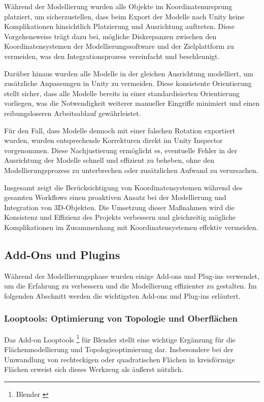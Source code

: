 Während der Modellierung wurden alle Objekte im Koordinatenursprung platziert, um sicherzustellen, dass beim Export
der Modelle nach Unity keine Komplikationen hinsichtlich Platzierung und Ausrichtung auftreten. Diese Vorgehensweise
trägt dazu bei, mögliche Diskrepanzen zwischen den Koordinatensystemen der Modellierungssoftware und der Zielplattform
zu vermeiden, was den Integrationsprozess vereinfacht und beschleunigt.

Darüber hinaus wurden alle Modelle in der gleichen Ausrichtung modelliert, um zusätzliche Anpassungen in Unity zu
vermeiden. Diese konsistente Orientierung stellt sicher, dass alle Modelle bereits in einer standardisierten
Orientierung vorliegen, was die Notwendigkeit weiterer manueller Eingriffe minimiert und einen reibungsloseren
Arbeitsablauf gewährleistet.

Für den Fall, dass Modelle dennoch mit einer falschen Rotation exportiert wurden, wurden entsprechende Korrekturen
direkt im Unity Inspector vorgenommen. Diese Nachjustierung ermöglicht es, eventuelle Fehler in der Ausrichtung der
Modelle schnell und effizient zu beheben, ohne den Modellierungsprozess zu unterbrechen oder zusätzlichen Aufwand zu
verursachen.

Insgesamt zeigt die Berücksichtigung von Koordinatensystemen während des gesamten Workflows einen proaktiven Ansatz
bei der Modellierung und Integration von 3D-Objekten. Die Umsetzung dieser Maßnahmen wird die Konsistenz und Effizienz
des Projekts verbessern und gleichzeitig mögliche Komplikationen im Zusammenhang mit Koordinatensystemen effektiv
vermeiden.

\subsection{Add-Ons und Plugins}
Während der Modellierungsphase wurden einige Add-ons und Plug-ins verwendet, um die Erfahrung zu verbessern und die
Modellierung effizienter zu gestalten. Im folgenden Abschnitt werden die wichtigsten Add-ons und Plug-ins erläutert.

\subsubsection{Looptools: Optimierung von Topologie und Oberflächen}
Das Add-on Looptools \footnote{Blender \cite{LoopTools}} für Blender stellt eine wichtige Ergänzung für die
Flächenmodellierung und Topologieoptimierung dar. Insbesondere bei der Umwandlung von rechteckigen oder quadratischen
Flächen in kreisförmige Flächen erweist sich dieses Werkzeug als äußerst nützlich.

